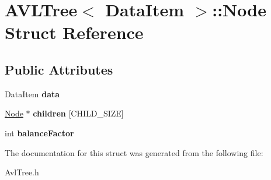 \hypertarget{structAVLTree_1_1Node}{\section{A\-V\-L\-Tree$<$ Data\-Item $>$\-:\-:Node Struct Reference}
\label{structAVLTree_1_1Node}
}
\subsection*{Public Attributes}
\begin{DoxyCompactItemize}
\item 
\hypertarget{structAVLTree_1_1Node_a7be4bf3468896388ac4ca7927efa5309}{Data\-Item {\bfseries data}}\label{structAVLTree_1_1Node_a7be4bf3468896388ac4ca7927efa5309}

\item 
\hypertarget{structAVLTree_1_1Node_a8be0751ba22e265f286feb85488a6faa}{\hyperlink{structAVLTree_1_1Node}{Node} $\ast$ {\bfseries children} \mbox{[}C\-H\-I\-L\-D\-\_\-\-S\-I\-Z\-E\mbox{]}}\label{structAVLTree_1_1Node_a8be0751ba22e265f286feb85488a6faa}

\item 
\hypertarget{structAVLTree_1_1Node_a0ac3a6b042130f476df783d77c350915}{int {\bfseries balance\-Factor}}\label{structAVLTree_1_1Node_a0ac3a6b042130f476df783d77c350915}

\end{DoxyCompactItemize}


The documentation for this struct was generated from the following file\-:\begin{DoxyCompactItemize}
\item 
Avl\-Tree.\-h\end{DoxyCompactItemize}
